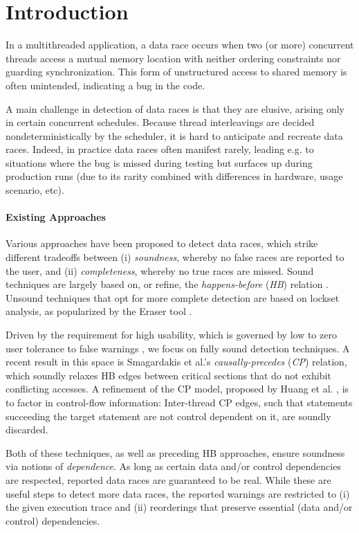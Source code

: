 \section{Introduction}\label{Se:introduction}

In a multithreaded application, a data race occurs when two (or more) concurrent threads access a mutual memory location with neither ordering constraints nor guarding synchronization. This form of unstructured access to shared memory is often unintended, indicating a bug in the code. 

A main challenge in detection of data races is that they are elusive, arising only in certain concurrent schedules. Because thread interleavings are decided nondeterministically by the scheduler, it is hard to anticipate and recreate data races. Indeed, in practice data races often manifest rarely, leading e.g. to situations where the bug is missed during testing but surfaces up during production runs (due to its rarity combined with differences in hardware, usage scenario, etc).

\paragraph{Existing Approaches} Various approaches have been proposed to detect data races, which strike different tradeoffs between (i) \emph{soundness}, whereby no false races are reported to the user, and (ii) \emph{completeness}, whereby no true races are missed. Sound techniques are largely based on, or refine, the \emph{happens-before} (\emph{HB}) relation \cite{XXX}. Unsound techniques that opt for more complete detection are based on lockset analysis, as popularized by the Eraser tool \cite{XXX}.

Driven by the requirement for high usability, which is governed by low to zero user tolerance to false warnings \cite{XXX}, we focus on fully sound detection techniques. A recent result in this space is Smagardakis et al.'s \emph{causally-precedes} (\emph{CP}) relation, which soundly relaxes HB edges between critical sections that do not exhibit conflicting accesses. A refinement of the CP model, proposed by Huang et al. \cite{XXX}, is to factor in control-flow information: Inter-thread CP edges, such that statements succeeding the target statement are not control dependent on it, are soundly discarded.

Both of these techniques, as well as preceding HB approaches, ensure soundness via notions of \emph{dependence}. As long as certain data and/or control dependencies are respected, reported data races are guaranteed to be real. While these are useful steps to detect more data races, the reported warnings are restricted to (i) the given execution trace and (ii) reorderings that preserve essential (data and/or control) dependencies.


